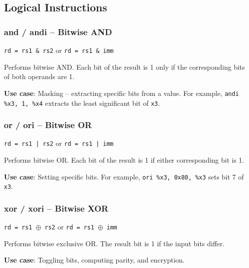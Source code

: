 \documentclass[12pt,a4paper]{article}
\begin{document}
\subsection{Logical Instructions}

\subsubsection{and / andi -- Bitwise AND}

\begin{tcolorbox}[colback=green!5, colframe=green!50!black]
\texttt{rd = rs1 \& rs2} \quad or \quad \texttt{rd = rs1 \& imm}
\end{tcolorbox}

Performs bitwise AND. Each bit of the result is 1 only if the corresponding bits of both operands are 1.

\textbf{Use case}: Masking -- extracting specific bits from a value. For example, \texttt{andi \%x3, 1, \%x4} extracts the least significant bit of \texttt{x3}.

\subsubsection{or / ori -- Bitwise OR}

\begin{tcolorbox}[colback=green!5, colframe=green!50!black]
\texttt{rd = rs1 | rs2} \quad or \quad \texttt{rd = rs1 | imm}
\end{tcolorbox}

Performs bitwise OR. Each bit of the result is 1 if either corresponding bit is 1.

\textbf{Use case}: Setting specific bits. For example, \texttt{ori \%x3, 0x80, \%x3} sets bit 7 of \texttt{x3}.

\subsubsection{xor / xori -- Bitwise XOR}

\begin{tcolorbox}[colback=green!5, colframe=green!50!black]
\texttt{rd = rs1 $\oplus$ rs2} \quad or \quad \texttt{rd = rs1 $\oplus$ imm}
\end{tcolorbox}

Performs bitwise exclusive OR. The result bit is 1 if the input bits differ.

\textbf{Use case}: Toggling bits, computing parity, and encryption.
\end{document}
